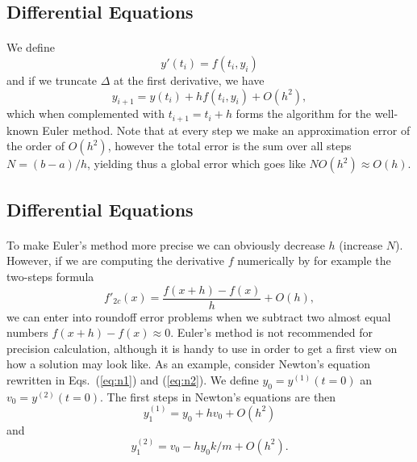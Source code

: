 \documentclass[%
oneside,                 %
final,                   %
10pt]{article}
\begin{document}
\subsection*{Differential Equations}

\paragraph{}
We define 
\begin{equation}
  y'(t_i)=f(t_i,y_i)   
\end{equation}
and if we truncate $\Delta$ at the first derivative, we have
\begin{equation}
   y_{i+1}=y(t_i) + hf(t_i,y_i) + O(h^2), \label{eq:euler}
\end{equation}
which when complemented with $t_{i+1}=t_i+h$ forms
the algorithm for the well-known Euler method. 
Note that at every step we make an approximation error
of the order of $O(h^2)$, however the total error is the sum over all
steps $N=(b-a)/h$, yielding thus a global error which goes like
$NO(h^2)\approx O(h)$.



\subsection*{Differential Equations}

\paragraph{}
To make Euler's method more precise we can obviously
decrease $h$ (increase $N$). However, if we are computing the 
derivative $f$ numerically  
by for example the two-steps formula
\[
    f'_{2c}(x)= \frac{f(x+h)-f(x)}{h}+O(h),
\]
we can enter into roundoff error problems when we subtract 
two almost equal numbers $f(x+h)-f(x)\approx 0$. 
Euler's method is not recommended for precision calculation,
although it is handy to use in order to get a first
view on how a solution may look like. As an example,
consider Newton's equation rewritten in Eqs.~(\ref{eq:n1}) and (\ref{eq:n2}). We define $y_0=y^{(1)}(t=0)$
an $v_0=y^{(2)}(t=0)$. The first steps in Newton's equations
are then
\begin{equation} 
   y^{(1)}_1=y_0+hv_0+O(h^2)
\end{equation}
and 
\begin{equation}
      y^{(2)}_1=v_0-hy_0k/m+O(h^2).
\end{equation}
\end{document}
